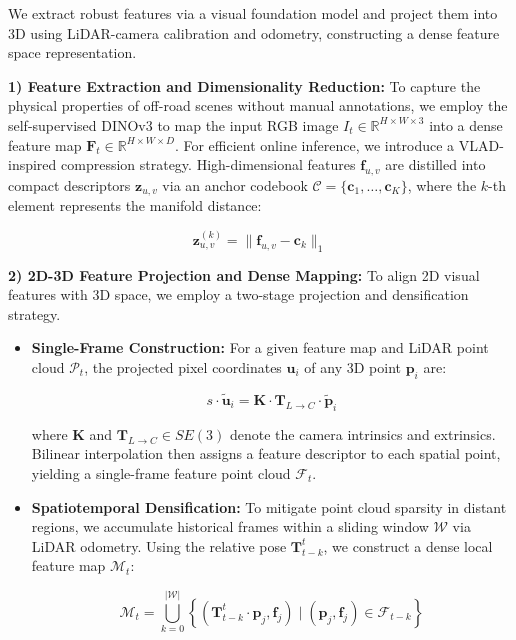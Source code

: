 \documentclass[letterpaper, 10 pt, conference]{ieeeconf}  %
\begin{document}
We extract robust features via a visual foundation model and project them into 3D using LiDAR-camera calibration and odometry, constructing a dense feature space representation.

\textbf{1) Feature Extraction and Dimensionality Reduction:} To capture the physical properties of off-road scenes without manual annotations, we employ the self-supervised DINOv3 \cite{c41} to map the input RGB image $I_t \in \mathbb{R}^{H \times W \times 3}$ into a dense feature map $\mathbf{F}_t \in \mathbb{R}^{H \times W \times D}$. For efficient online inference, we introduce a VLAD-inspired compression strategy. High-dimensional features $\mathbf{f}_{u,v}$ are distilled into compact descriptors $\mathbf{z}_{u,v}$ via an anchor codebook $\mathcal{C} = \{ \mathbf{c}_1, \dots, \mathbf{c}_K \}$, where the $k$-th element represents the manifold distance:

\begin{equation}
\label{eq:projection}
\mathbf{z}_{u,v}^{(k)} = \| \mathbf{f}_{u,v} - \mathbf{c}_k \|_1
\end{equation}

\textbf{2) 2D-3D Feature Projection and Dense Mapping:} To align 2D visual features with 3D space, we employ a two-stage projection and densification strategy.

\begin{itemize}
\item \textbf{Single-Frame Construction:} For a given feature map and LiDAR point cloud $\mathcal{P}_t$, the projected pixel coordinates $\mathbf{u}_i$ of any 3D point $\mathbf{p}_i$ are:

\begin{equation}
\label{eq:densification}
s \cdot \tilde{\mathbf{u}}_i = \mathbf{K} \cdot \mathbf{T}_{L \to C} \cdot \tilde{\mathbf{p}}_i
\end{equation}

where $\mathbf{K}$ and $\mathbf{T}_{L \to C} \in SE(3)$ denote the camera intrinsics and extrinsics. Bilinear interpolation then assigns a feature descriptor to each spatial point, yielding a single-frame feature point cloud $\mathcal{F}_t$.

\item \textbf{Spatiotemporal Densification:} To mitigate point cloud sparsity in distant regions, we accumulate historical frames within a sliding window $\mathcal{W}$ via LiDAR odometry. Using the relative pose $\mathbf{T}_{t-k}^{t}$, we construct a dense local feature map $\mathcal{M}_t$:

\begin{equation}
\label{eq:manifold_dist}
\mathcal{M}_t = \bigcup_{k=0}^{|\mathcal{W}|} \left\{ (\mathbf{T}_{t-k}^{t} \cdot \mathbf{p}_j, \mathbf{f}_j) \mid (\mathbf{p}_j, \mathbf{f}_j) \in \mathcal{F}_{t-k} \right\}
\end{equation}


\end{itemize}
\end{document}
